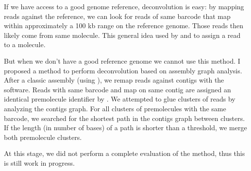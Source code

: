 \documentclass[main.tex]{subfiles}
\begin{document}
If we have access to a good genome reference, deconvolution is easy: by mapping reads against the reference, we can look for reads of same barcode that map within approximately a 100 kb range on the reference genome. Those reads then likely come from same molecule. This general idea used by \cite{ema} and \cite{lariat} to assign a read to a molecule.

But when we don't have a good reference genome we cannot use this method. 
I proposed a method to perform deconvolution based on assembly graph analysis.
After a classic \DBG assembly (using ), we remap reads against contigs with the   software. Reads with same barcode and map on same contig are assigned an identical premolecule identifier by . We attempted to glue clusters of reads by analyzing the contigs graph. For all clusters of premolecules with the same barcode, we searched for the shortest path in the contigs graph between clusters. If the length (in number of bases) of a path is shorter than a threshold, we merge both premolecule clusters. 

At this stage, we did not perform a complete evaluation of the method, thus this is still work in progress.

\end{document}
